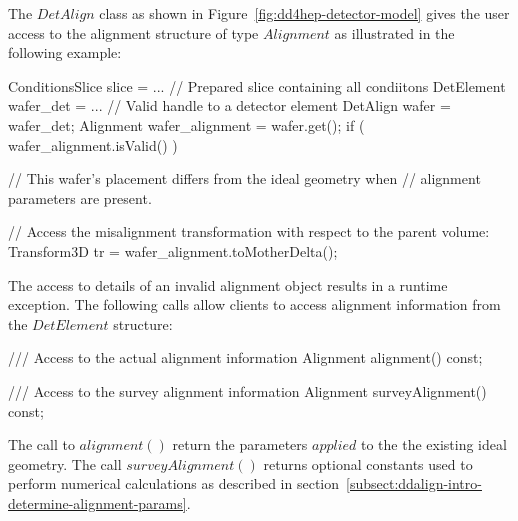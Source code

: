 \documentclass[10pt,a4paper]{article}
\begin{document}
\noindent
The $DetAlign$ class as shown in Figure~\ref{fig:dd4hep-detector-model}
gives the user access to the alignment structure of type $Alignment$ as 
illustrated in the following example:
\begin{code}
    ConditionsSlice slice = ...  // Prepared slice containing all condiitons
    DetElement wafer_det  = ...  // Valid handle to a detector element
    DetAlign   wafer = wafer_det;
    Alignment  wafer_alignment = wafer.get();
    if ( wafer_alignment.isValid() )  {
        // This wafer's placement differs from the ideal geometry when
        // alignment parameters are present.
        
        // Access the misalignment transformation with respect to the parent volume:
        Transform3D tr = wafer_alignment.toMotherDelta();
    }
\end{code}
The access to details of an invalid alignment object results in a runtime 
exception. The following calls allow clients to access alignment information
from the $DetElement$ structure:
\begin{code}
      /// Access to the actual alignment information
      Alignment alignment() const;

      /// Access to the survey alignment information
      Alignment surveyAlignment() const;
\end{code}
The call to $alignment()$ return the parameters $applied$ to the the existing
ideal geometry. The call $surveyAlignment()$ returns optional constants used 
to perform numerical calculations as described in 
section~\ref{subsect:ddalign-intro-determine-alignment-params}.
\end{document}
